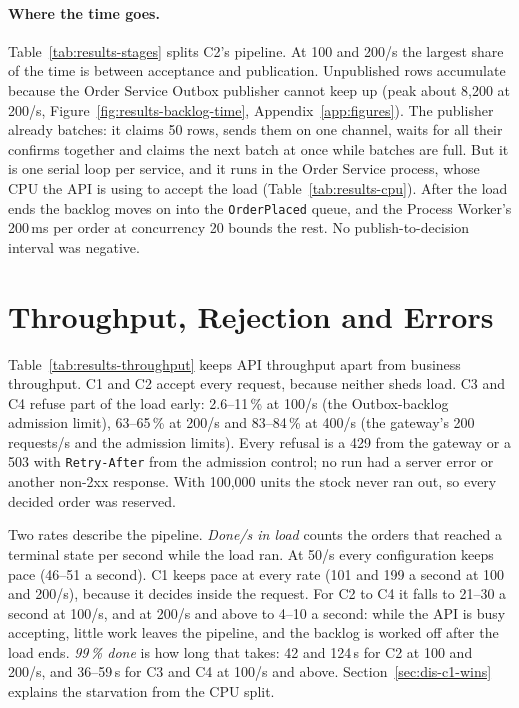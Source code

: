 \documentclass[a4paper]{report}
\begin{document}
\paragraph{Where the time goes.} Table~\ref{tab:results-stages} splits C2's
pipeline. At 100 and 200/s the largest share of the time is between acceptance
and publication. Unpublished rows accumulate because the Order Service Outbox
publisher cannot keep up (peak about 8,200 at 200/s,
Figure~\ref{fig:results-backlog-time}, Appendix~\ref{app:figures}). The
publisher already batches: it
claims 50 rows, sends them on one channel, waits for all their confirms
together and claims the next batch at once while batches are full. But it is
one serial loop per service, and it runs in the Order Service process, whose
CPU the API is using to accept the load (Table~\ref{tab:results-cpu}). After the load ends the backlog moves
on into the \texttt{OrderPlaced} queue, and the Process Worker's 200\,ms per
order at concurrency 20 bounds the rest. No publish-to-decision interval was
negative.

\begin{table}[tbp]
\centering
\footnotesize
{}
\caption{Time spent in each stage of the C2 pipeline (s), per order from the
stage timestamps. Negative counts publish-to-decision intervals below zero
(\texttt{PublishedAt} is the send time of the confirmed publish); none
occurred. Cells: median of 3 runs (range).}
\label{tab:results-stages}
\end{table}

\section{Throughput, Rejection and Errors}

Table~\ref{tab:results-throughput} keeps API throughput apart from business
throughput. C1 and C2 accept every request, because neither sheds load. C3 and
C4 refuse part of the load early: 2.6--11\,\% at 100/s (the Outbox-backlog
admission limit), 63--65\,\% at 200/s and 83--84\,\% at 400/s (the gateway's
200 requests/s and the admission limits). Every refusal is a 429 from the
gateway or a 503 with \texttt{Retry-After} from the admission control; no run had a server error or another non-2xx
response. With 100,000 units the stock never ran out, so every decided order
was reserved.

Two rates describe the pipeline. \emph{Done/s in load} counts the orders
that reached a terminal state per second while the load ran. At 50/s every
configuration keeps pace (46--51 a second). C1 keeps pace at every rate (101
and 199 a second at 100 and 200/s), because it decides inside the request. For
C2 to C4 it falls to 21--30 a second at 100/s, and at 200/s and above to 4--10
a second: while the API is busy accepting, little work leaves the pipeline,
and the backlog is worked off
after the load ends. \emph{99\,\% done} is how long that takes: 42 and
124\,s for C2 at 100 and 200/s, and 36--59\,s for C3 and C4 at 100/s and
above. Section~\ref{sec:dis-c1-wins} explains the starvation from the CPU
split.
\end{document}
